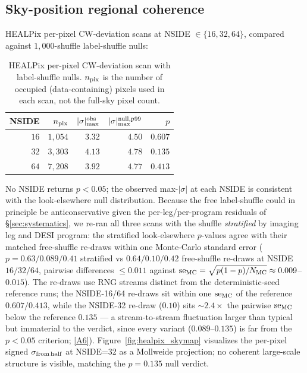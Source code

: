 \documentclass[twocolumn,linenumbers]{aastex702}
\newcommand{\repoBase}{https://github.com/Hubify-Projects/bigbounce/blob/main}
\begin{document}
\subsection{Sky-position regional coherence}\label{sec:results_healpix}

HEALPix per-pixel CW-deviation scans at NSIDE $\in \{16, 32, 64\}$,
compared against $1{,}000$-shuffle label-shuffle nulls:

\begin{table}[ht]
\caption{HEALPix per-pixel CW-deviation scan with label-shuffle nulls.
$n_{\rm pix}$ is the number of occupied (data-containing) pixels used
in each scan, not the full-sky pixel count.}
\label{tab:healpix}
\begin{ruledtabular}
\begin{tabular}{rrrrr}
NSIDE & $n_{\rm pix}$ & $|\sigma|^{\rm obs}_{\max}$ &
$|\sigma|^{\rm null,p99}_{\max}$ & $p$ \\
\hline
$16$ & $1{,}054$ & $3.32$ & $4.50$ & $0.607$ \\
$32$ & $3{,}303$ & $4.13$ & $4.78$ & $0.135$ \\
$64$ & $7{,}208$ & $3.92$ & $4.77$ & $0.413$ \\
\end{tabular}
\end{ruledtabular}
\end{table}

No NSIDE returns $p<0.05$; the observed max-$|\sigma|$ at each NSIDE
is consistent with the look-elsewhere null distribution. Because the
free label-shuffle could in principle be anticonservative given the
per-leg/per-program residuals of \S\ref{sec:systematics}, we re-ran
all three scans with the shuffle \emph{stratified} by imaging leg and
DESI program: the stratified look-elsewhere $p$-values agree with
their matched free-shuffle re-draws within one Monte-Carlo standard
error ($p = 0.63 / 0.089 / 0.41$ stratified vs
$0.64 / 0.10 / 0.42$ free-shuffle re-draws at NSIDE $16/32/64$,
pairwise differences $\leq 0.011$ against
${\rm se}_{\rm MC} = \sqrt{p(1-p)/N_{\rm MC}} \approx 0.009$--$0.015$).
The re-draws use RNG streams distinct from the deterministic-seed
reference runs; the NSIDE-16/64 re-draws sit within one
${\rm se}_{\rm MC}$ of the reference $0.607/0.413$, while the NSIDE-32
re-draw ($0.10$) sits ${\sim}2.4\times$ the pairwise
${\rm se}_{\rm MC}$ below the reference $0.135$ --- a stream-to-stream
fluctuation larger than typical but immaterial to the verdict, since
every variant ($0.089$--$0.135$) is far from the $p<0.05$ criterion;
\href{\repoBase/pipelines/p5\_desi\_chirality/outputs/18\_v0151\_stratified\_and\_density.json}{[A6]}).
Figure~\ref{fig:healpix_skymap} visualizes the per-pixel signed
$\sigma_{\rm from\,half}$ at NSIDE=32 as a Mollweide projection; no
coherent large-scale structure is visible, matching the $p\!=\!0.135$
null verdict.
\end{document}

